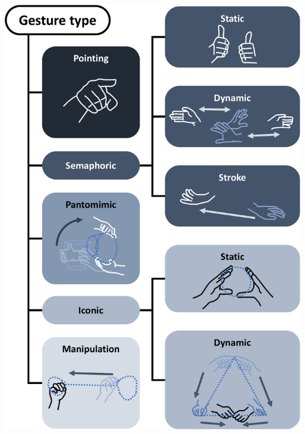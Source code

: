 \noindent
\begin{minipage}{\textwidth}
\vspace{6pt}
  \begin{minipage}[c]{0.30\textwidth}
    \centering
    \vspace{3pt}
    \includegraphics[width=\linewidth]{Figures/LUI/aigner.pdf}
    \label{fig:lui:aigner-classification}
    \vspace{-16pt}
    \captionsetup{width=.99\linewidth}
  \end{minipage}%
  \begin{minipage}[c]{0.70\textwidth}
    \centering
    \footnotesize
    \resizebox{\linewidth}{!}{
    \renewcommand{\arraystretch}{1.1}
}
\end{minipage}
\end{minipage}
